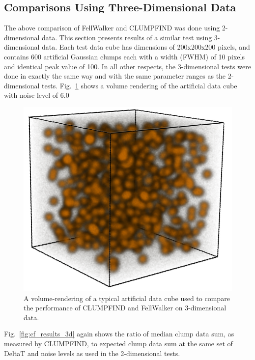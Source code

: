 \documentclass[final,authoryear,5p,times,twocolumn]{elsarticle}
\begin{document}
\subsection{Comparisons Using Three-Dimensional Data}

The above comparison of FellWalker and CLUMPFIND was done using
2-dimensional data. This section presents results of a similar test using
3-dimensional data. Each test data cube has dimensions of 200x200x200
pixels, and contains 600 artificial Gaussian clumps each with a width
(FWHM) of 10 pixels and identical peak value of 100. In all other
respects, the 3-dimensional tests were done in exactly the same way and
with the same parameter ranges as the 2-dimensional tests.
Fig.~\ref{fig:true_6} shows a volume rendering of the artificial data
cube with noise level of 6.0

\begin{figure}
\includegraphics[width=\columnwidth]{true_6}
\caption{A volume-rendering of a typical artificial data cube used to
compare the performance of CLUMPFIND and FellWalker on 3-dimensional data.}
\label{fig:true_6}
\end{figure}

Fig.~\ref{fig:cf_results_3d} again shows the ratio of median clump data
sum, as measured by CLUMPFIND, to expected clump data sum at the same set
of DeltaT and noise levels as used in the 2-dimensional tests.
\end{document}
